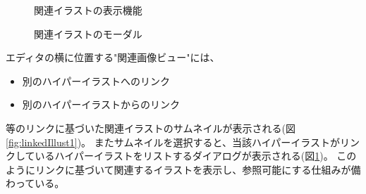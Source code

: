 \begin{figure}[htbp] \begin{minipage}{0.5\hsize}
                         \begin{center} 
                         \end{center} \caption{関連イラストの表示機能} \label{fig:linkedIllust1}
\end{minipage} \begin{minipage}{0.5\hsize}
                   \begin{center} 
                   \end{center} \caption{関連イラストのモーダル} \label{fig:linkedIllust2}
\end{minipage}
\end{figure}

エディタの横に位置する"関連画像ビュー"には、
\begin{itemize}
    \item 別のハイパーイラストへのリンク
    \item 別のハイパーイラストからのリンク
\end{itemize}等のリンクに基づいた関連イラストのサムネイルが表示される(図\ref{fig:linkedIllust1})。
またサムネイルを選択すると、当該ハイパーイラストがリンクしているハイパーイラストをリストするダイアログが表示される(図\ref{fig:linkedIllust2})。
このようにリンクに基づいて関連するイラストを表示し、参照可能にする仕組みが備わっている。

